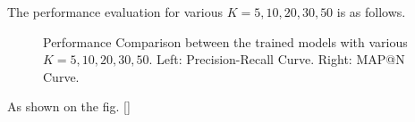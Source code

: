 \documentclass{article} %
\begin{document}
The performance evaluation for various $K=5,10,20,30,50$ is as follows.
\begin{figure}[hp]
    \centering
    \captionsetup{justification=centering}
    \caption{Performance Comparison between the trained models with various
        $K=5,10,20,30,50$.  Left: Precision-Recall Curve. Right: MAP@N Curve. }
    \label{EffectK:RP_MAP}
\end{figure}
As shown on the fig. \ref{}

\newpage
\end{document}
